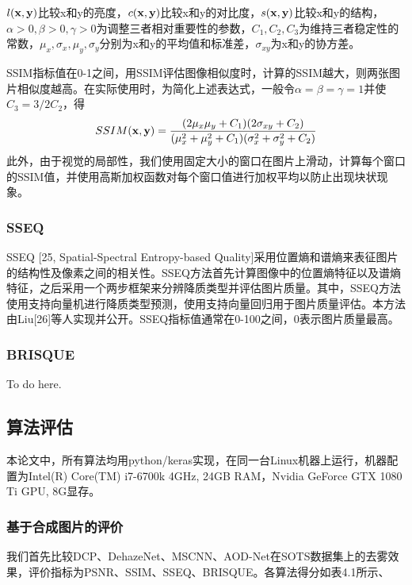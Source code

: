 \documentclass[a4paper, 12pt]{report}
\begin{document}
$l{\bf (x, y)}$比较x和y的亮度，$c{\bf (x, y)}$比较x和y的对比度，$s{\bf (x, y)}$比较x和y的结构，$\alpha > 0, \beta > 0, \gamma > 0$为调整三者相对重要性的参数，$C_1, C_2, C_3$为维持三者稳定性的常数，$\mu_x, \sigma_x, \mu_y, \sigma_y$分别为x和y的平均值和标准差，$\sigma_{xy}$为x和y的协方差。

SSIM指标值在0-1之间，用SSIM评估图像相似度时，计算的SSIM越大，则两张图片相似度越高。在实际使用时，为简化上述表达式，一般令$\alpha = \beta = \gamma = 1$并使$C_3 = 3/2 C_2$，得
\begin{equation}
SSIM({\bf x, y}) = \frac{(2\mu_x\mu_y + C_1)(2\sigma_{xy}+ C_2)}{(\mu_x^2 + \mu_y^2 + C_1)(\sigma_x^2 + \sigma_y^2 + C_2)}
\end{equation}
此外，由于视觉的局部性，我们使用固定大小的窗口在图片上滑动，计算每个窗口的SSIM值，并使用高斯加权函数对每个窗口值进行加权平均以防止出现块状现象。

\subsubsection{SSEQ}
SSEQ [25, Spatial-Spectral Entropy-based Quality]采用位置熵和谱熵来表征图片的结构性及像素之间的相关性。SSEQ方法首先计算图像中的位置熵特征以及谱熵特征，之后采用一个两步框架来分辨降质类型并评估图片质量。其中，SSEQ方法使用支持向量机进行降质类型预测，使用支持向量回归用于图片质量评估。本方法由Liu[26]等人实现并公开。SSEQ指标值通常在0-100之间，0表示图片质量最高。

\subsubsection{BRISQUE}
To do here.

\subsection{算法评估\quad}
本论文中，所有算法均用python/keras实现，在同一台Linux机器上运行，机器配置为Intel(R) Core(TM) i7-6700k 4GHz, 24GB RAM，Nvidia GeForce GTX 1080 Ti GPU, 8G显存。

\subsubsection{基于合成图片的评价\quad}
我们首先比较DCP、DehazeNet、MSCNN、AOD-Net在SOTS数据集上的去雾效果，评价指标为PSNR、SSIM、SSEQ、BRISQUE。各算法得分如表4.1所示、
\end{document}
